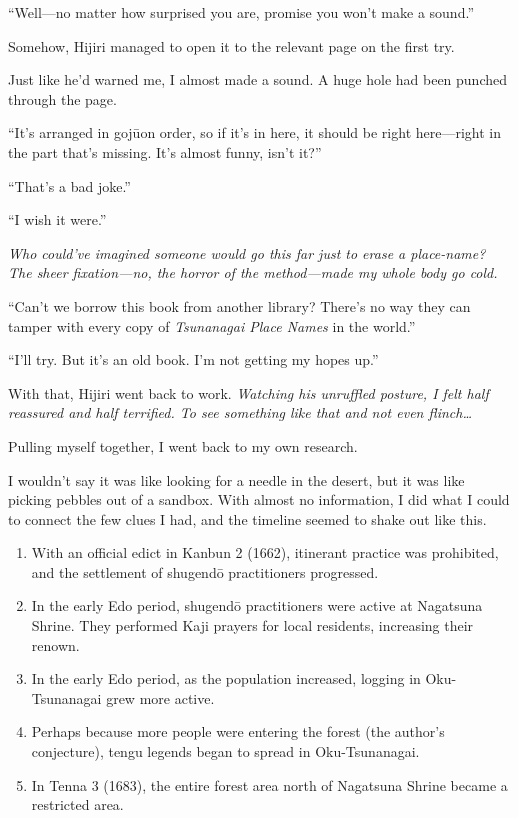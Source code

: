 \documentclass[
    a4paper,
    12pt,
    twoside,
    openany,
    UTF8,
    fontset=windows
]{ctexbook}
\begin{document}
``Well---no matter how surprised you are, promise you won't make a sound.''

Somehow, Hijiri managed to open it to the relevant page on the first try.

Just like he'd warned me, I almost made a sound. A huge hole had been punched through the page.

``It's arranged in goj\=uon order, so if it's in here, it should be right here---right in the part that's missing. It's almost funny, isn't it?''

``That's a bad joke.''

``I wish it were.''

\textit{Who could've imagined someone would go this far just to erase a place-name? The sheer fixation---no, the horror of the method---made my whole body go cold.}

``Can't we borrow this book from another library? There's no way they can tamper with every copy of \textit{Tsunanagai Place Names} in the world.''

``I'll try. But it's an old book. I'm not getting my hopes up.''

With that, Hijiri went back to work. \textit{Watching his unruffled posture, I felt half reassured and half terrified. To see something like that and not even flinch\dots}

Pulling myself together, I went back to my own research.

I wouldn't say it was like looking for a needle in the desert, but it was like picking pebbles out of a sandbox. With almost no information, I did what I could to connect the few clues I had, and the timeline seemed to shake out like this.

\begin{enumerate}
\item With an official edict in Kanbun 2 (1662), itinerant practice was prohibited, and the settlement of shugend\=o practitioners progressed.
\item In the early Edo period, shugend\=o practitioners were active at Nagatsuna Shrine. They performed Kaji prayers for local residents, increasing their renown.
\item In the early Edo period, as the population increased, logging in Oku-Tsunanagai grew more active.
\item Perhaps because more people were entering the forest (the author's conjecture), tengu legends began to spread in Oku-Tsunanagai.
\item In Tenna 3 (1683), the entire forest area north of Nagatsuna Shrine became a restricted area.
\end{enumerate}
\end{document}
